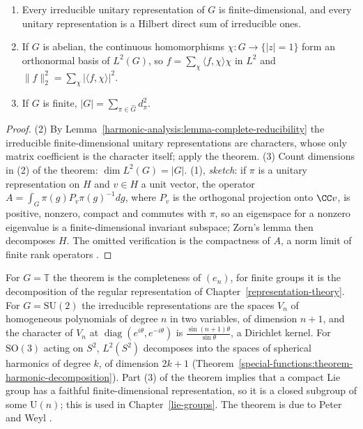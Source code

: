 \begin{corollary}\label{harmonic-analysis:corollary-peter-weyl}
\begin{enumerate}
\item Every irreducible unitary representation of $G$ is finite-dimensional, and every unitary representation is a Hilbert direct sum of irreducible ones.
\item If $G$ is abelian, the continuous homomorphisms $\chi \colon G \to \{|z| = 1\}$ form an orthonormal basis of $L^2(G)$, so $f = \sum_\chi\langle f, \chi\rangle\chi$ in $L^2$ and $\|f\|_2^2 = \sum_\chi|\langle f, \chi\rangle|^2$.
\item If $G$ is finite, $|G| = \sum_{\pi \in \widehat G}d_\pi^2$.
\end{enumerate}
\end{corollary}

\begin{proof}
(2) By Lemma~\ref{harmonic-analysis:lemma-complete-reducibility} the irreducible finite-dimensional unitary representations are characters, whose only matrix coefficient is the character itself; apply the theorem.
(3) Count dimensions in (2) of the theorem: $\dim L^2(G) = |G|$.
(1), \emph{sketch}: if $\pi$ is a unitary representation on $H$ and $v \in H$ a unit vector, the operator $A = \int_G\pi(g)P_v\pi(g)^{-1}dg$, where $P_v$ is the orthogonal projection onto $\CC v$, is positive, nonzero, compact
and commutes with $\pi$, so an eigenspace for a nonzero eigenvalue is a finite-dimensional invariant subspace; Zorn's lemma then decomposes $H$. The omitted verification is the compactness of $A$, a norm limit of finite
rank operators \cite{folland-abstract}.
\end{proof}

\begin{remark}\label{harmonic-analysis:remark-peter-weyl}
For $G = \mathbb{T}$ the theorem is the completeness of $(e_n)$, for finite groups it is the decomposition of the regular representation of Chapter~\ref{representation-theory}. For $G = \mathrm{SU}(2)$ the irreducible
representations are the spaces $V_n$ of homogeneous polynomials of degree $n$ in two variables, of dimension $n + 1$, and the character of $V_n$ at $\operatorname{diag}(e^{i\theta}, e^{-i\theta})$ is
$\frac{\sin(n + 1)\theta}{\sin\theta}$, a Dirichlet kernel. For $\mathrm{SO}(3)$ acting on $S^2$, $L^2(S^2)$ decomposes into the spaces of spherical harmonics of degree $k$, of dimension $2k + 1$
(Theorem~\ref{special-functions:theorem-harmonic-decomposition}). Part (3) of the theorem implies that a compact Lie group has a faithful finite-dimensional representation, so it is a closed subgroup of some $\mathrm{U}(n)$; this
is used in Chapter~\ref{lie-groups}. The theorem is due to Peter and Weyl \cite{peter-weyl-1927}.
\end{remark}

